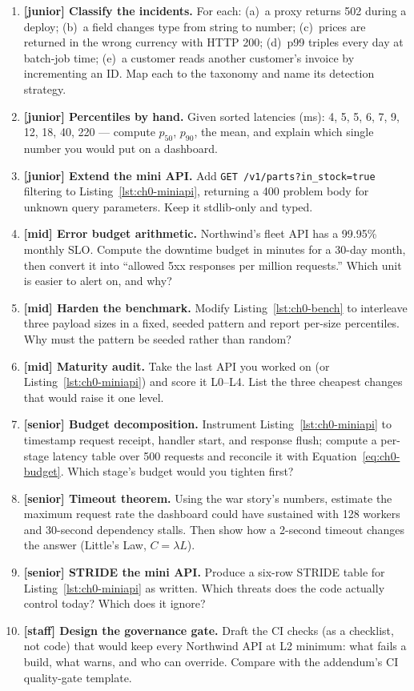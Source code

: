 \begin{enumerate}[label=\textbf{E0.\arabic*.}]
  \item \textbf{[junior] Classify the incidents.} For each: (a)~a proxy
    returns 502 during a deploy; (b)~a field changes type from string to
    number; (c)~prices are returned in the wrong currency with HTTP 200;
    (d)~p99 triples every day at batch-job time; (e)~a customer reads
    another customer's invoice by incrementing an ID. Map each to the
    taxonomy and name its detection strategy.
  \item \textbf{[junior] Percentiles by hand.} Given sorted latencies (ms):
    4, 5, 5, 6, 7, 9, 12, 18, 40, 220 --- compute $p_{50}$, $p_{90}$, the
    mean, and explain which single number you would put on a dashboard.
  \item \textbf{[junior] Extend the mini API.} Add
    \texttt{GET /v1/parts?in\_stock=true} filtering to
    Listing~\ref{lst:ch0-miniapi}, returning a 400 problem body for unknown
    query parameters. Keep it stdlib-only and typed.
  \item \textbf{[mid] Error budget arithmetic.} Northwind's fleet API has a
    99.95\% monthly SLO. Compute the downtime budget in minutes for a
    30-day month, then convert it into ``allowed 5xx responses per million
    requests.'' Which unit is easier to alert on, and why?
  \item \textbf{[mid] Harden the benchmark.} Modify
    Listing~\ref{lst:ch0-bench} to interleave three payload sizes in a
    fixed, seeded pattern and report per-size percentiles. Why must the
    pattern be seeded rather than random?
  \item \textbf{[mid] Maturity audit.} Take the last API you worked on (or
    Listing~\ref{lst:ch0-miniapi}) and score it L0--L4. List the three
    cheapest changes that would raise it one level.
  \item \textbf{[senior] Budget decomposition.} Instrument
    Listing~\ref{lst:ch0-miniapi} to timestamp request receipt, handler
    start, and response flush; compute a per-stage latency table over 500
    requests and reconcile it with Equation~\eqref{eq:ch0-budget}. Which
    stage's budget would you tighten first?
  \item \textbf{[senior] Timeout theorem.} Using the war story's numbers,
    estimate the maximum request rate the dashboard could have sustained
    with 128 workers and 30-second dependency stalls. Then show how a
    2-second timeout changes the answer (Little's Law, $C=\lambda L$).
  \item \textbf{[senior] STRIDE the mini API.} Produce a six-row STRIDE
    table for Listing~\ref{lst:ch0-miniapi} as written. Which threats does
    the code actually control today? Which does it ignore?
  \item \textbf{[staff] Design the governance gate.} Draft the CI checks
    (as a checklist, not code) that would keep every Northwind API at L2
    minimum: what fails a build, what warns, and who can override. Compare
    with the addendum's CI quality-gate template.
\end{enumerate}

